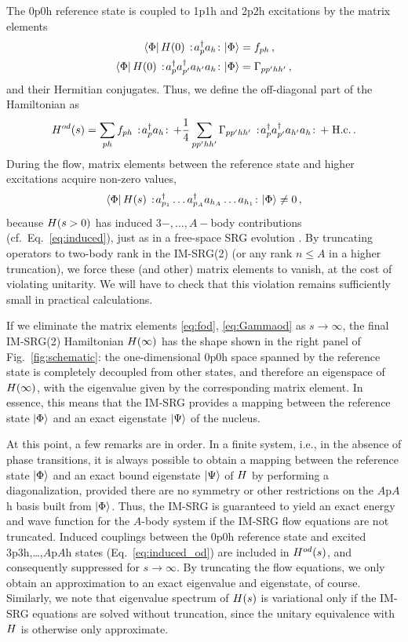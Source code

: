 The 0p0h reference state is coupled to 1p1h and 2p2h excitations by the matrix elements
\begin{align}
  \matrixe{\Phi}{\HO(0)\nord{\aaO_{p}\aO_{h}}}{\Phi}&=f_{ph}\,,\label{eq:fod}\\
  \matrixe{\Phi}{\HO(0)\nord{\aaO_{p}\aaO_{p'}\aO_{h'}\aO_{h}}}{\Phi}&=\Gamma_{pp'hh'}\label{eq:Gammaod}\,,
\end{align}
and their Hermitian conjugates. Thus, we define the off-diagonal part of the Hamiltonian as
\begin{equation}
  \HO^{od}(s) = \sum_{ph}f_{ph}\nord{\aaO_p\aO_h} + \frac{1}{4}\sum_{pp'hh'}\Gamma_{pp'hh'}\nord{\aaO_p\aaO_{p'}\aO_{h'}\aO_h}
                +\; \text{H.c.}\label{eq:def_Hod}\,.
\end{equation}
During the flow, matrix elements between the reference state and higher excitations acquire non-zero values,
\begin{equation}\label{eq:induced_od}
  \matrixe{\Phi}{\HO(s)\nord{\aaO_{p_1}\ldots\aaO_{p_A}\aO_{h_{A}}\ldots\aO_{h_1}}}{\Phi}\neq 0\,,
\end{equation}
because $H(s>0)$ has induced $3-,\ldots,A-$body contributions (cf.~Eq.~\eqref{eq:induced}), just as in a 
free-space SRG evolution \cite{Bogner:2010pq,Jurgenson:2009bs,Hebeler:2012ly}. By truncating operators to 
two-body rank in the IM-SRG(2) (or any rank $n\leq A$ in a higher truncation), we force these (and other) 
matrix elements to vanish, at the cost of violating unitarity. We will have to check that this violation 
remains sufficiently small in practical calculations.

If we eliminate the matrix elements \eqref{eq:fod}, \eqref{eq:Gammaod} as $s\to\infty$, the final IM-SRG(2) 
Hamiltonian $H(\infty)$ has the shape shown in the right panel of Fig.~\ref{fig:schematic}: the 
one-dimensional $0$p$0$h space spanned by the reference state is completely decoupled from other 
states, and therefore an eigenspace of $H(\infty)$, with the eigenvalue given by the corresponding 
matrix element. In essence, this means that the IM-SRG provides a mapping between the reference 
state $\ket{\Phi}$ and an exact eigenstate $\ket{\Psi}$ of the nucleus. 

At this point, a few remarks are in order. In a finite system, i.e., in the absence of phase transitions, 
it is always possible to obtain a mapping between the reference state $\ket{\Phi}$ and an exact bound 
eigenstate $\ket{\Psi}$ of $H$ by performing a diagonalization, provided there are no symmetry or other 
restrictions on the $A$p$A$h basis built from $\ket{\Phi}$. Thus, the IM-SRG is guaranteed to yield an 
exact energy and wave function for the $A$-body system if the IM-SRG flow equations are not truncated. 
Induced couplings between the 0p0h reference state and excited 3p3h,\ldots,$A$p$A$h states 
(Eq.~\eqref{eq:induced_od}) are included in $H^{od}(s)$, and consequently suppressed for $s\to\infty$. 
By truncating the flow equations, we only obtain an approximation to an exact eigenvalue and eigenstate, 
of course. Similarly, we note that eigenvalue spectrum of $H(s)$ is variational only if the IM-SRG equations are solved without truncation, since the unitary equivalence with $H$ is otherwise only approximate. 

